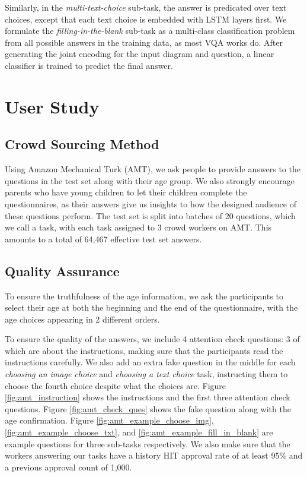 \documentclass{article}
\begin{document}
Similarly, in the \textit{multi-text-choice} sub-task, the answer is predicated over text choices, except that each text choice is embedded with LSTM layers first. 
We formulate the \textit{filling-in-the-blank} sub-task as a multi-class classification problem from all possible answers in the training data, as most VQA works do. After generating the joint encoding for the input diagram and question, a linear classifier is trained to predict the final answer.



\section{User Study}
\label{app_user_study}

\subsection{Crowd Sourcing Method}
Using Amazon Mechanical Turk (AMT), we ask people to provide answers to the questions in the test set along with their age group. We also strongly encourage parents who have young children to let their children complete the questionnaires, as their answers give us insights to how the designed audience of these questions perform. The test set is split into batches of 20 questions, which we call a task, with each task assigned to 3 crowd workers on AMT. This amounts to a total of 64,467 effective test set answers.

\subsection{Quality Assurance}

To ensure the truthfulness of the age information, we ask the participants to select their age at both the beginning and the end of the questionnaire, with the age choices appearing in 2 different orders. \par
To ensure the quality of the answers, we include 4 attention check questions: 3 of which are about the instructions, making sure that the participants read the instructions carefully. We also add an extra fake question in the middle for each \textit{choosing an image choice} and \textit{choosing a text choice} task, instructing them to choose the fourth choice despite what the choices are. Figure \ref{fig:amt_instruction} shows the instructions and the first three attention check questions. Figure \ref{fig:amt_check_ques} shows the fake question along with the age confirmation. Figure \ref{fig:amt_example_choose_img}, \ref{fig:amt_example_choose_txt}, and \ref{fig:amt_example_fill_in_blank} are example questions for three sub-tasks respectively. We also make sure that the workers answering our tasks have a history HIT approval rate of at least 95\% and a previous approval count of 1,000. 
\end{document}
